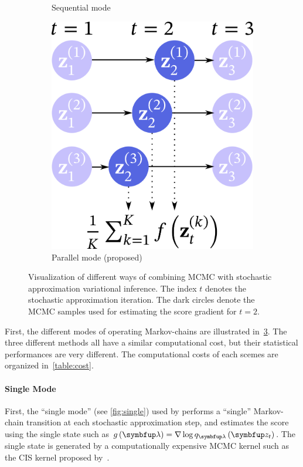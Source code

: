 \begin{figure}
\begin{subfigure}[b]{0.35\textwidth}
        \caption{Sequential mode}\label{fig:seq}
    \end{subfigure}
    \begin{subfigure}[b]{0.3\textwidth}
        \centering
        \includegraphics[scale=0.25]{figures/diagram_3.png}
        \caption{Parallel mode (proposed)}\label{fig:par}
    \end{subfigure}
    \caption{Visualization of different ways of combining MCMC with stochastic approximation variational inference.
    The index \(t\) denotes the stochastic approximation iteration.
    The dark circles denote the MCMC samples used for estimating the score gradient for \(t=2\).
    }\label{fig:overview}
\end{figure}
%

%
First, the different modes of operating Markov-chains are illustrated in~\cref{fig:overview}.
The three different methods all have a similar computational cost, but their statistical performances are very different.
The computational costs of each scemes are organized in~\cref{table:cost}.
%
%





\paragraph{Single Mode}
First, the ``single mode'' (see \cref{fig:single}) used by \citet{NEURIPS2020_b2070693} performs a ``single'' Markov-chain transition at each stochastic approximation step, and estimates the score using the single state such as \(g\left(\vlambda\right) = \nabla \log q_{\vlambda}\left(\vz_t\right)\).
The single state is generated by a computationally expensive MCMC kernel such as the CIS kernel proposed by~\citeauthor{NEURIPS2020_b2070693}.

